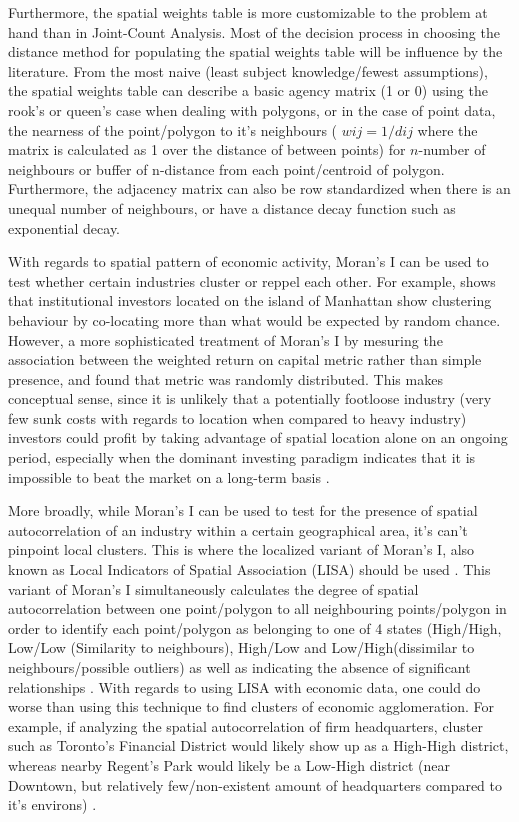 \documentclass[12pt,letterpaper,notitlepage,onecolumn,final,openbib]{article}
\begin{document}
Furthermore, the spatial weights table is more customizable to the problem at hand than in Joint-Count Analysis.  Most of the decision process in choosing the distance method for populating the spatial weights table will be influence by the literature.  From the most naive (least subject knowledge/fewest assumptions), the spatial weights table can describe a basic agency matrix (1 or 0) using the rook's or queen's case when dealing with polygons, or in the case of point data, the nearness of the point/polygon to it's neighbours ( $wij = 1/dij$ where the matrix is calculated as 1 over the distance of between points) for $n$-number of neighbours or buffer of n-distance from each point/centroid of polygon.  Furthermore, the adjacency matrix can also be row standardized when there is an unequal number of neighbours, or have a distance decay function such as exponential decay.   

With regards to spatial pattern of economic activity, Moran's I can be used to test whether certain industries cluster or reppel each other.  For example,  shows that institutional investors located on the island of Manhattan show clustering behaviour by co-locating more than what would be expected by random chance.  However, a more sophisticated treatment of Moran's I by mesuring the association between the weighted return on capital metric rather than simple presence, and found that metric was randomly distributed.  This makes conceptual sense, since it is unlikely that a potentially footloose industry (very few sunk costs with regards to location when compared to heavy industry)  investors could profit by taking advantage of spatial location alone on an ongoing period, especially when the dominant investing paradigm indicates that it is impossible to beat the market on a long-term basis \cite{Malkiel2005}.  

More broadly, while Moran's I can be used to test for the presence of spatial autocorrelation of an industry within a certain geographical area, it's can't pinpoint local clusters.  This is where the localized variant of Moran's I, also known as Local Indicators of Spatial Association (LISA) should be used \cite{anselin1995local}.  This variant of Moran's I simultaneously calculates the degree of spatial autocorrelation between one point/polygon to all neighbouring points/polygon in order to identify each point/polygon as belonging to one of 4 states (High/High, Low/Low (Similarity to neighbours), High/Low and Low/High(dissimilar to neighbours/possible outliers) as well as indicating the absence of significant relationships \cite{Anselin2003}.  With regards to using LISA with economic data, one could do worse than using this technique to find clusters of economic agglomeration.  For example, if analyzing the spatial autocorrelation of firm headquarters, cluster such as Toronto's Financial District would likely show up as a High-High district, whereas nearby Regent's Park would likely be a Low-High district (near Downtown, but relatively few/non-existent amount of headquarters compared to it's environs) . 



	\pagebreak
	
	
\end{document}
